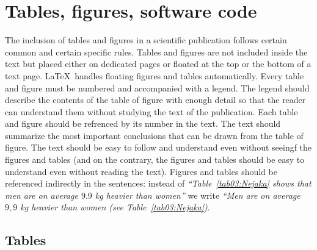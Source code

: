 %
%	 
%

\chapter{Tables, figures, software code}

The inclusion of tables and figures in a scientific publication follows
certain common and certain specific rules. Tables and figures are not
included inside the text but placed either on dedicated pages or floated
at the top or the bottom of a text page. \LaTeX\ handles floating
figures and tables automatically. Every table and figure must be
numbered and accompanied with a legend. The legend should describe the
contents of the table of figure with enough detail so that the reader
can understand them without studying the text of the publication. Each
table and figure should be refrenced by its number in the text. The
text should summarize the most important conclusions that can be drawn
from the table of figure. The text should be easy to follow and
understand even without seeingf the figures and tables (and on the
contrary, the figures and tables should be easy to understand even
without reading the text). Figures and tables should be referenced
indirectly in the sentences: instead of
\emph{``Table~\ref{tab03:Nejaka} shows that men are on average $9.9$
  kg heavier than women''} we write \emph{``Men are on average $9,9$
  kg heavier than women (see Table~\ref{tab03:Nejaka})}.


\section{Tables}


